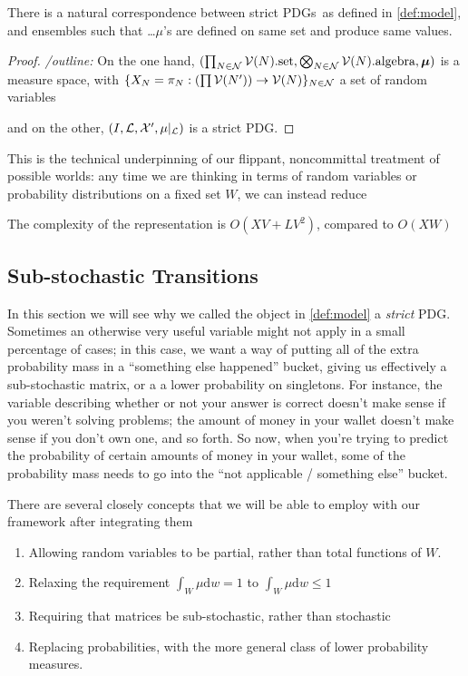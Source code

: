 \documentclass{article}
\newcommand{\MN}{PDG}
\newcommand{\MNs}{PDGs}
\newcommand\bmu{\boldsymbol{\mu}}
\begin{document}
	
	\begin{prop}
		There is a natural correspondence between strict \MNs\ as defined in \cref{def:model}, and ensembles such that  \ldots $\mu$'s are defined on same set and produce same values.
	\end{prop}
	\begin{proof}
		\textit{/outline:}
		On the one hand, $(\prod_{N \in \cal N} \mathcal V(N).\text{set}, \bigotimes_{N \in \cal N} \mathcal V(N).\text{algebra}, \bmu)$ is a measure space, with $\{X_N = \pi_N : \left(\prod\mathcal V(N')\right) \to  \mathcal V(N) \}_{N \in \cal N}$ a set of random variables
		
		and  on the other, $(I, \mathcal L, \mathcal X', \mu|_{\cal L})$ is a strict \MN.
	\end{proof}
	
	This is the technical underpinning of our flippant, noncommittal treatment of possible worlds: any time we are thinking in terms of random variables or probability distributions on a fixed set $W$, we can instead reduce
	
	
	The complexity of the representation is $O(XV + L V^2)$, compared to $O(XW)$
	
	

	\subsection{Sub-stochastic Transitions}
	
	In this section we will see why we called the object in \cref{def:model} a \textit{strict} \MN.	
	Sometimes an otherwise very useful variable might not apply in a small percentage of cases; in this case, we want a way of putting all of the extra probability mass in a ``something else happened'' bucket, giving us effectively a sub-stochastic matrix, or a a lower probability on singletons. For instance, the variable describing whether or not your answer is correct doesn't make sense if you weren't solving problems; the amount of money in your wallet doesn't make sense if you don't own one, and so forth. So now, when you're trying to predict the probability of certain amounts of money in your wallet, some of the probability mass needs to go into the ``not applicable / something else'' bucket. 
	
	There are several closely concepts that we will be able to employ with our framework after integrating them
	\begin{enumerate}[nosep]
		\item Allowing random variables to be partial, rather than total functions of $W$. 
		\item Relaxing the requirement $\int_W \mu \mathrm{d}w = 1$ to $\int_W \mu \mathrm{d}w \leq 1$
		\item Requiring that matrices be sub-stochastic, rather than stochastic
		\item Replacing probabilities, with the more general class of lower probability measures.
	\end{enumerate}
\end{document}
